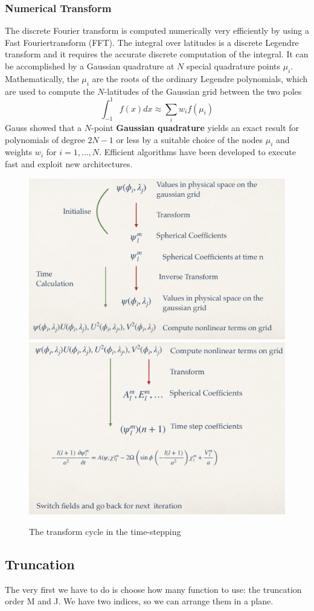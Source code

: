 \subsubsection{Numerical Transform}
The discrete Fourier transform is computed numerically very efficiently by using a Fast Fouriertransform (FFT).
The integral over latitudes is a discrete Legendre transform and it requires the accurate discrete computation of the integral. It can be accomplished by a Gaussian
quadrature at $N$ special quadrature points $\mu_i$. Mathematically, the $\mu_i$ are the roots of the ordinary Legendre polynomials, which are used to compute the $N$-latitudes of the Gaussian grid between the two poles
$$\int_{-1}^1 f(x)dx\approx\displaystyle\sum_iw_if(\mu_i)$$
Gauss showed that a $N$-point \textbf{Gaussian quadrature} yields an exact result for polynomials of degree $2N-1$ or less by a suitable choice of the nodes $\mu_i$ and weights $w_i$ for $i=1,\dots,N$. Efficient algorithms have been developed to execute fast and exploit new architectures.
\begin{figure}[htpb]
    \centering
    \includegraphics[width=0.5\linewidth]{uploads/Screenshot 2024-11-19 125912.png}\quad\includegraphics[width=0.5\linewidth]{uploads/Screenshot 2024-11-19 130025.png}
    \caption{The transform cycle in the time-stepping}
    \label{fig:transform cycle}
\end{figure}    




\subsection{Truncation}
The very first we have to do is choose how many function to
use: the truncation order M and J. We have two indices, so
we can arrange them in a plane. 


